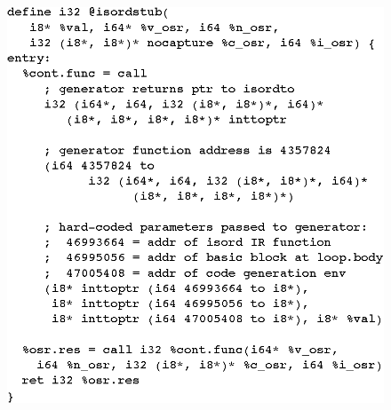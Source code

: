 \ifdefined\noauthorea
\begin{figure}[t]
\begin{center}
\includegraphics[width=0.9\columnwidth]{figures/isordstub/isordstub.eps}
\caption{\protect}
\end{center}
\end{figure}
\fi

